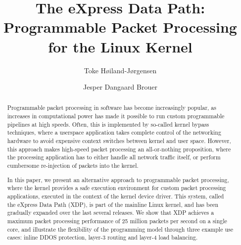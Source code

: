 \documentclass[10pt,sigconf]{acmart}
\begin{document}
\title{The eXpress Data Path: Programmable Packet Processing for the Linux Kernel}
\author{Toke Høiland-Jørgensen}

\author{Jesper Dangaard Brouer}

\renewcommand{\shorttitle}{The eXpress Data Path}
\captionsetup{font+=small}



\begin{abstract}
  Programmable packet processing in software has become increasingly popular, as
  increases in computational power has made it possible to run custom
  programmable pipelines at high speeds. Often, this is implemented by so-called
  kernel bypass techniques, where a userspace application takes complete control
  of the networking hardware to avoid expensive context switches between kernel
  and user space. However, this approach makes high-speed packet processing an
  all-or-nothing proposition, where the processing application has to either
  handle all network traffic itself, or perform cumbersome re-injection of
  packets into the kernel.

  In this paper, we present an alternative approach to programmable packet
  processing, where the kernel provides a safe execution environment for custom
  packet processing applications, executed in the context of the kernel device
  driver. This system, called the eXpress Data Path (XDP), is part of the
  mainline Linux kernel, and has been gradually expanded over the last several
  releases. We show that XDP achieves a maximum packet processing performance of
  25 million packets per second on a single core, and illustrate the flexibility
  of the programming model through three example use cases: inline DDOS
  protection, layer-3 routing and layer-4 load balancing.
\end{abstract}


\maketitle
\end{document}
